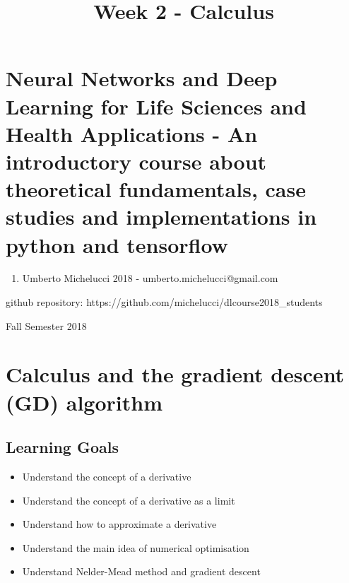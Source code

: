 \documentclass[11pt]{article}
\title{Week 2 - Calculus}
\providecommand{\tightlist}{%
      \setlength{\itemsep}{0pt}\setlength{\parskip}{0pt}}
\begin{document}
    
    
    \maketitle
    
    

    
    \section{Neural Networks and Deep Learning for Life Sciences and Health
Applications - An introductory course about theoretical fundamentals,
case studies and implementations in python and
tensorflow}\label{neural-networks-and-deep-learning-for-life-sciences-and-health-applications---an-introductory-course-about-theoretical-fundamentals-case-studies-and-implementations-in-python-and-tensorflow}

    \begin{enumerate}
\def\labelenumi{(\Alph{enumi})}
\setcounter{enumi}{2}
\tightlist
\item
  Umberto Michelucci 2018 - umberto.michelucci@gmail.com
\end{enumerate}

github repository: https://github.com/michelucci/dlcourse2018\_students

Fall Semester 2018

    \section{Calculus and the gradient descent (GD)
algorithm}\label{calculus-and-the-gradient-descent-gd-algorithm}

\subsection{Learning Goals}\label{learning-goals}

    \begin{itemize}
\tightlist
\item
  Understand the concept of a derivative
\item
  Understand the concept of a derivative as a limit
\item
  Understand how to approximate a derivative
\item
  Understand the main idea of numerical optimisation
\item
  Understand Nelder-Mead method and gradient descent
\end{itemize}
\end{document}
